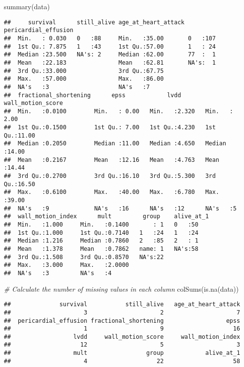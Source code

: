 \documentclass[
]{article}
\newenvironment{Shaded}{\begin{snugshade}}{\end{snugshade}}
\newcommand{\CommentTok}[1]{\textcolor[rgb]{0.56,0.35,0.01}{\textit{#1}}}
\newcommand{\FunctionTok}[1]{\textcolor[rgb]{0.00,0.00,0.00}{#1}}
\newcommand{\NormalTok}[1]{#1}
\begin{document}
\begin{Shaded}
\begin{Highlighting}[]
\FunctionTok{summary}\NormalTok{(data)}
\end{Highlighting}
\end{Shaded}

\begin{verbatim}
##     survival      still_alive age_at_heart_attack pericardial_effusion
##  Min.   : 0.030   0   :88     Min.   :35.00       0   :107            
##  1st Qu.: 7.875   1   :43     1st Qu.:57.00       1   : 24            
##  Median :23.500   NA's: 2     Median :62.00       77  :  1            
##  Mean   :22.183               Mean   :62.81       NA's:  1            
##  3rd Qu.:33.000               3rd Qu.:67.75                           
##  Max.   :57.000               Max.   :86.00                           
##  NA's   :3                    NA's   :7                               
##  fractional_shortening      epss            lvdd       wall_motion_score
##  Min.   :0.0100        Min.   : 0.00   Min.   :2.320   Min.   : 2.00    
##  1st Qu.:0.1500        1st Qu.: 7.00   1st Qu.:4.230   1st Qu.:11.00    
##  Median :0.2050        Median :11.00   Median :4.650   Median :14.00    
##  Mean   :0.2167        Mean   :12.16   Mean   :4.763   Mean   :14.44    
##  3rd Qu.:0.2700        3rd Qu.:16.10   3rd Qu.:5.300   3rd Qu.:16.50    
##  Max.   :0.6100        Max.   :40.00   Max.   :6.780   Max.   :39.00    
##  NA's   :9             NA's   :16      NA's   :12      NA's   :5        
##  wall_motion_index      mult         group    alive_at_1
##  Min.   :1.000     Min.   :0.1400       : 1   0   :50   
##  1st Qu.:1.000     1st Qu.:0.7140   1   :24   1   :24   
##  Median :1.216     Median :0.7860   2   :85   2   : 1   
##  Mean   :1.378     Mean   :0.7862   name: 1   NA's:58   
##  3rd Qu.:1.508     3rd Qu.:0.8570   NA's:22             
##  Max.   :3.000     Max.   :2.0000                       
##  NA's   :3         NA's   :4
\end{verbatim}

\begin{Shaded}
\begin{Highlighting}[]
\CommentTok{\# Calculate the number of missing values in each column}
\FunctionTok{colSums}\NormalTok{(}\FunctionTok{is.na}\NormalTok{(data))}
\end{Highlighting}
\end{Shaded}

\begin{verbatim}
##              survival           still_alive   age_at_heart_attack 
##                     3                     2                     7 
##  pericardial_effusion fractional_shortening                  epss 
##                     1                     9                    16 
##                  lvdd     wall_motion_score     wall_motion_index 
##                    12                     5                     3 
##                  mult                 group            alive_at_1 
##                     4                    22                    58
\end{verbatim}
\end{document}
